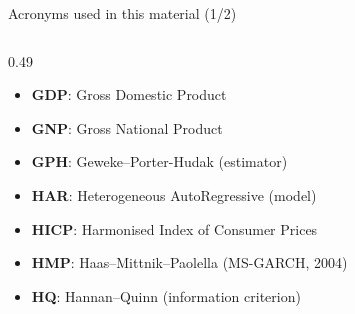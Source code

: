 \begin{frame}{Acronyms used in this material (1/2)}
\begin{columns}[T]
\begin{column}{0.49\textwidth}
\begin{itemize}
    \item \textbf{GDP}: Gross Domestic Product
    \item \textbf{GNP}: Gross National Product
    \item \textbf{GPH}: Geweke–Porter-Hudak (estimator)
    \item \textbf{HAR}: Heterogeneous AutoRegressive (model)
    \item \textbf{HICP}: Harmonised Index of Consumer Prices
    \item \textbf{HMP}: Haas–Mittnik–Paolella (MS-GARCH, 2004)
    \item \textbf{HQ}: Hannan–Quinn (information criterion)
\end{itemize}
\end{column}
\end{columns}
\end{frame}
